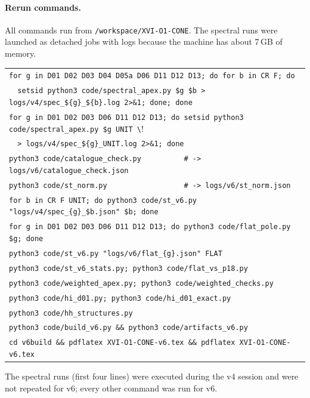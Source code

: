 \documentclass[11pt,a4paper]{article}
\newcommand{\loc}[1]{\nolinkurl{#1}}
\theoremstyle{plain}
\theoremstyle{definition}
\theoremstyle{remark}
\numberwithin{equation}{section}
\begin{document}
\paragraph{Rerun commands.}
All commands run from \loc{/workspace/XVI-O1-CONE}.
The spectral runs were launched as detached jobs with logs because
the machine has about 7\,GB of memory.
\begin{center}\footnotesize
\begin{tabular}{@{}l@{}}
\verb!for g in D01 D02 D03 D04 D05a D06 D11 D12 D13; do for b in CR F; do!\\
\verb!  setsid python3 code/spectral_apex.py $g $b > logs/v4/spec_${g}_${b}.log 2>&1; done; done!\\
\verb!for g in D01 D02 D03 D06 D11 D12 D13; do setsid python3 code/spectral_apex.py $g UNIT \!\\
\verb!  > logs/v4/spec_${g}_UNIT.log 2>&1; done!\\
\verb!python3 code/catalogue_check.py          # -> logs/v6/catalogue_check.json!\\
\verb!python3 code/st_norm.py                  # -> logs/v6/st_norm.json!\\
\verb!for b in CR F UNIT; do python3 code/st_v6.py "logs/v4/spec_{g}_$b.json" $b; done!\\
\verb!for g in D01 D02 D03 D06 D11 D12 D13; do python3 code/flat_pole.py $g; done!\\
\verb!python3 code/st_v6.py "logs/v6/flat_{g}.json" FLAT!\\
\verb!python3 code/st_v6_stats.py; python3 code/flat_vs_p18.py!\\
\verb!python3 code/weighted_apex.py; python3 code/weighted_checks.py!\\
\verb!python3 code/hi_d01.py; python3 code/hi_d01_exact.py!\\
\verb!python3 code/hh_structures.py!\\
\verb!python3 code/build_v6.py && python3 code/artifacts_v6.py!\\
\verb!cd v6build && pdflatex XVI-O1-CONE-v6.tex && pdflatex XVI-O1-CONE-v6.tex!
\end{tabular}
\end{center}
The spectral runs (first four lines) were executed during the v4 session
and were not repeated for v6; every other command was run for v6.
\end{document}
